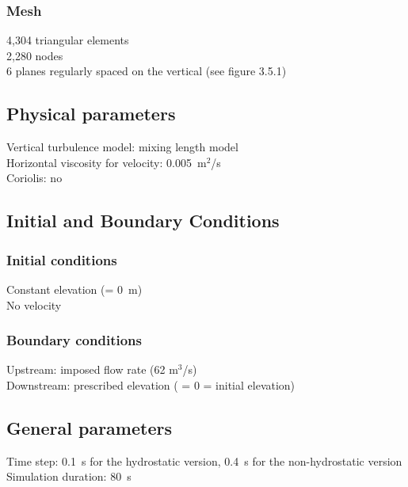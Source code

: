 \subsubsection{Mesh}
%
4,304 triangular elements\\
2,280 nodes\\
6 planes regularly spaced on the vertical (see figure 3.5.1)
%
%
%
\subsection{Physical parameters}
%
Vertical turbulence model: mixing length model\\
Horizontal viscosity for velocity: 0.005~m$^2$/s\\
Coriolis: no
%
%
%
%
%
%
\subsection{Initial and Boundary Conditions}
%
\subsubsection{Initial conditions}
%
Constant elevation (= 0~m)\\
No velocity
%
\subsubsection{Boundary conditions}
%
Upstream: imposed flow rate (62 m$^3$/s)\\
Downstream: prescribed elevation ( = 0 = initial elevation)
%
\subsection{General parameters}
%
Time step: 0.1~s for the hydrostatic version, 0.4~s for the
non-hydrostatic version\\
Simulation duration: 80~s
%
%
%
